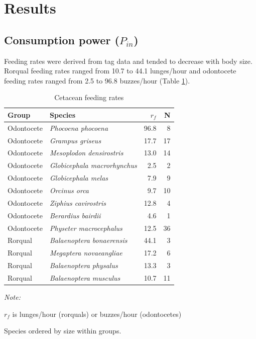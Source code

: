 \documentclass[]{elsarticle} %
\begin{document}
\section{Results}\label{results}

\subsection{\texorpdfstring{Consumption power
(\(P_{in}\))}{Consumption power (P\_\{in\})}}\label{consumption-power-p_in-1}

Feeding rates were derived from tag data and tended to decrease with
body size. Rorqual feeding rates ranged from 10.7 to 44.1 lunges/hour
and odontocete feeding rates ranged from 2.5 to 96.8 buzzes/hour (Table
\ref{rf_tbl}).

\begin{table}[t]

\caption{\label{tab:unnamed-chunk-1}Cetacean feeding rates \label{rf_tbl}}
\centering
\begin{threeparttable}
\begin{tabular}{llrr}
\toprule
Group & Species & $r_f$ & N\\
\midrule
Odontocete & \textit{Phocoena phocoena} & 96.8 & 8\\
Odontocete & \textit{Grampus griseus} & 17.7 & 17\\
Odontocete & \textit{Mesoplodon densirostris} & 13.0 & 14\\
Odontocete & \textit{Globicephala macrorhynchus} & 2.5 & 2\\
Odontocete & \textit{Globicephala melas} & 7.9 & 9\\
Odontocete & \textit{Orcinus orca} & 9.7 & 10\\
Odontocete & \textit{Ziphius cavirostris} & 12.8 & 4\\
Odontocete & \textit{Berardius bairdii} & 4.6 & 1\\
Odontocete & \textit{Physeter macrocephalus} & 12.5 & 36\\
Rorqual & \textit{Balaenoptera bonaerensis} & 44.1 & 3\\
Rorqual & \textit{Megaptera novaeangliae} & 17.2 & 6\\
Rorqual & \textit{Balaenoptera physalus} & 13.3 & 3\\
Rorqual & \textit{Balaenoptera musculus} & 10.7 & 11\\
\bottomrule
\end{tabular}
\begin{tablenotes}
\item \textit{Note: } 
\item $r_f$ is lunges/hour (rorquals) or buzzes/hour (odontocetes)
\item Species ordered by size within groups.
\end{tablenotes}
\end{threeparttable}
\end{table}
\end{document}
